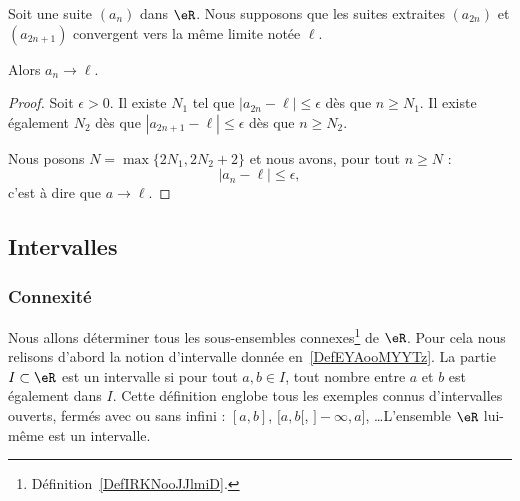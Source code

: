 \begin{proposition}      \label{PROPooXOOCooGMqJNe}
    Soit une suite \( (a_n)\) dans \( \eR\).  Nous supposons que les suites extraites \( (a_{2n})\) et \( (a_{2n+1})\) convergent vers la même limite notée \( \ell\).

    Alors \( a_n\to \ell\).
\end{proposition}

\begin{proof}
    Soit \( \epsilon>0\). Il existe \( N_1\) tel que \( | a_{2n}-\ell |\leq \epsilon\) dès que \( n\geq N_1\). Il existe également \( N_2\) dès que \( | a_{2n+1}-\ell |\leq \epsilon\) dès que \( n\geq N_2\).

    Nous posons \( N=\max\{ 2N_1,2N_2+2 \}\) et nous avons, pour tout \( n\geq N\) :
    \begin{equation}
        | a_n-\ell |\leq \epsilon,
    \end{equation}
    c'est à dire que \( a\to \ell\).
\end{proof}



\subsection{Intervalles}

\subsubsection{Connexité}

Nous allons déterminer tous les sous-ensembles connexes\footnote{Définition~\ref{DefIRKNooJJlmiD}.} de $\eR$. Pour cela nous relisons d'abord la notion d'intervalle donnée en~\ref{DefEYAooMYYTz}. La partie \( I\subset \eR\) est un intervalle si pour tout \( a,b\in I\), tout nombre entre \( a\) et \( b\) est également dans \( I\). Cette définition englobe tous les exemples connus d'intervalles ouverts, fermés avec ou sans infini : $[a,b]$, $[a,b[$, $]-\infty,a]$, \ldots L'ensemble \( \eR\) lui-même est un intervalle.

